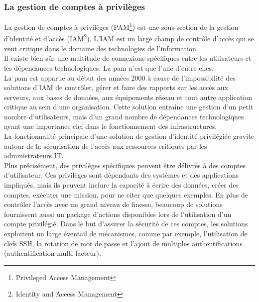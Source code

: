 \subsubsection{La gestion de comptes à privilèges}
La gestion de comptes à privilèges (PAM\footnote{Privileged Access Management}) est une sous-section de la gestion d’identité et d’accès (IAM\footnote{Identity and Access Management}). L’IAM est un large champ de contrôle d’accès qui se veut critique dans le domaine des technologies de l’information.\\
Il existe bien sûr une multitude de connexions spécifiques entre les utilisateurs et les dépendances technologiques. La \gls{pam} n’est que l’une d’entre elles.\\
La \gls{pam} est apparue au début des années 2000 à cause de l’impossibilité des solutions d’IAM de contrôler, gérer et faire des rapports sur les accès aux serveurs, aux bases de données, aux équipements réseau et tout autre application critique au sein d’une organisation. Cette solution entraîne une gestion d’un petit nombre d’utilisateurs, mais d’un grand nombre de dépendances technologiques ayant une importance clef dans le fonctionnement des infrastructures.\\
La fonctionnalité principale d’une solution de gestion d’identité privilégiée gravite autour de la sécurisation de l’accès aux ressources critiques par les administrateurs IT.\\
Plus précisément, des privilèges spécifiques peuvent être délivrés à des comptes d’utilisateur. Ces privilèges sont dépendants des systèmes et des applications impliqués, mais ils peuvent inclure la capacité à écrire des données, créer des comptes, exécuter une mission, pour ne citer que quelques exemples. En plus de contrôler l’accès avec un grand niveau de finesse, beaucoup de solutions fournissent aussi un package d’actions disponibles lors de l’utilisation d’un compte privilégié. Dans le but d’assurer la sécurité de ces comptes, les solutions exploitent un large éventail de mécanismes, comme par exemple, l’utilisation de clefs SSH, la rotation de mot de passe et l’ajout de multiples authentifications (authentification multi-facteur).\\
